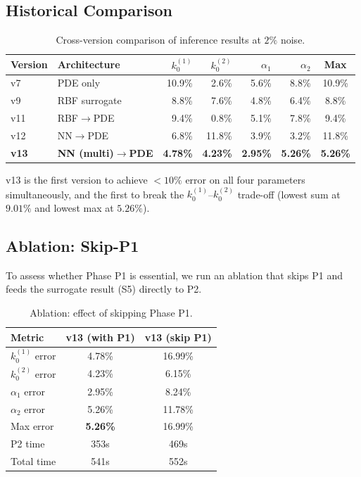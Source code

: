 \documentclass[11pt,a4paper]{article}
\newcommand{\kzero}{k_0}
\begin{document}
\subsection{Historical Comparison}\label{sec:history}

\begin{table}[H]
\centering
\caption{Cross-version comparison of inference results at $2\%$ noise.}
\label{tab:history}
\begin{tabular}{llrrrrc}
\toprule
Version & Architecture & $\kzero^{(1)}$ & $\kzero^{(2)}$ & $\alpha_1$
  & $\alpha_2$ & Max \\
\midrule
v7  & PDE only       & 10.9\% & 2.6\%  & 5.6\% & 8.8\%  & 10.9\% \\
v9  & RBF surrogate  & 8.8\%  & 7.6\%  & 4.8\% & 6.4\%  & 8.8\% \\
v11 & RBF$\to$PDE    & 9.4\%  & 0.8\%  & 5.1\% & 7.8\%  & 9.4\% \\
v12 & NN$\to$PDE     & 6.8\%  & 11.8\% & 3.9\% & 3.2\%  & 11.8\% \\
\midrule
\textbf{v13} & \textbf{NN (multi)$\to$PDE} & \textbf{4.78\%} & \textbf{4.23\%}
  & \textbf{2.95\%} & \textbf{5.26\%} & \textbf{5.26\%} \\
\bottomrule
\end{tabular}
\end{table}

v13 is the first version to achieve $< 10\%$ error on all four
parameters simultaneously, and the first to break the
$\kzero^{(1)}$--$\kzero^{(2)}$ trade-off (lowest sum at $9.01\%$ and
lowest max at $5.26\%$).

\subsection{Ablation: Skip-P1}\label{sec:ablation}

To assess whether Phase P1 is essential, we run an ablation that skips
P1 and feeds the surrogate result (S5) directly to P2.

\begin{table}[H]
\centering
\caption{Ablation: effect of skipping Phase P1.}
\label{tab:ablation}
\begin{tabular}{lcc}
\toprule
Metric & v13 (with P1) & v13 (skip P1) \\
\midrule
$\kzero^{(1)}$ error  & 4.78\%   & 16.99\% \\
$\kzero^{(2)}$ error  & 4.23\%   & 6.15\% \\
$\alpha_1$ error       & 2.95\%   & 8.24\% \\
$\alpha_2$ error       & 5.26\%   & 11.78\% \\
\midrule
Max error              & \textbf{5.26\%} & 16.99\% \\
P2 time                & 353s     & 469s \\
Total time             & 541s     & 552s \\
\bottomrule
\end{tabular}
\end{table}
\end{document}
